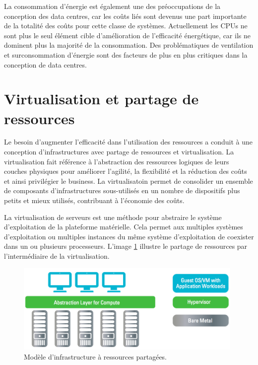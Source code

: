 La consommation d'énergie est également une des préoccupations de la conception des data centres, car les coûts liés sont devenus une part importante de la totalité des coûts pour cette classe de systèmes. Actuellement les CPUs ne sont plus le seul élément cible d'amélioration de l'efficacité énergétique, car ils ne dominent plus la majorité de la consommation. Des problématiques de ventilation et surconsommation d'énergie sont des facteurs de plus en plus critiques dans la conception de data centres.\cite{datacenterAsComputerIntro} \cite{dataCenterEvolution}

\section{Virtualisation et partage de ressources}

Le besoin d'augmenter l'efficacité dans l'utilisation des ressources a conduit à une conception d'infrastructures avec partage de ressources et virtualisation. La virtualisation fait référence à l'abstraction des ressources logiques de leurs couches physiques pour améliorer l'agilité, la flexibilité et la réduction des coûts et ainsi privilégier le business. La virtualisatoin permet de consolider un ensemble de composants d'infrastructures sous-utilisés en un nombre de dispositifs plus petits et mieux utilisés, contribuant à l'économie des coûts.

La virtualisation de serveurs est une méthode pour abstraire le système d'exploitation de la plateforme matérielle. Cela permet aux multiples systèmes d'exploitation ou multiples instances du même système d'exploitation de coexister dans un ou plusieurs processeurs. L'image \ref{virtinfra} illustre le partage de ressources par l'intermédiaire de la virtualisation.

\begin{figure}[h]
\begin{center}
\includegraphics[width=0.98\textwidth]{images/shared_infa_virt} 
\caption{Modèle d'infrastructure à ressources partagées. \cite{journeySDDC}}\label{virtinfra}
\end{center}
\end{figure}

